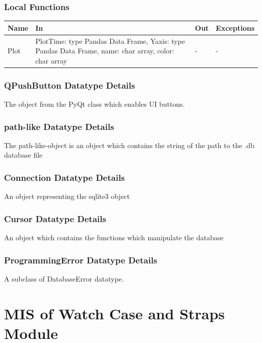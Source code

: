 \documentclass[12pt, titlepage]{article}
\begin{document}
\subsubsection{Local Functions}

\begin{center}
\begin{tabular}{p{3cm} p{3cm} p{2cm} p{4cm}}
\hline
\textbf{Name} & \textbf{In} & \textbf{Out} & \textbf{Exceptions} \\
\hline
Plot & PlotTime: type Pandas Data Frame, Yaxis: type Pandas Data Frame, name: char array, color: char array & - & - \\
\hline
\end{tabular}
\end{center}


\subsubsection{QPushButton Datatype Details}
The object from the PyQt class which enables UI buttons.

\subsubsection{path-like Datatype Details}
The path-like-object is an object which contains the string of the path to the .db database file

\subsubsection{Connection Datatype Details}
An object representing the sqlite3 object

\subsubsection{Cursor Datatype Details}
An object which contains the functions which manipulate the database

\subsubsection{ProgrammingError Datatype Details}
A subclass of DatabaseError datatype.

\newpage


\section{MIS of Watch Case and Straps Module} \label{mPD} 
\end{document}
